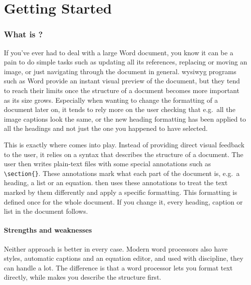 \part{Getting Started}
\section{What is ?}\label{sec:what-is-latex}
If you've ever had to deal with a large Word document, you know it can be a pain to do simple tasks such as updating all its references, replacing or moving an image, or just navigating through the document in general.
\gls{wysiwyg} programs such as Word provide an instant visual preview of the document,
but they tend to reach their limits once the structure of a document becomes more important as its size grows.
Especially when wanting to change the formatting of a document later on,
it tends to rely more on the user checking that e.g.\ all the image captions look the same,
or the new heading formatting has been applied to all the headings and not just the one you happened to have selected.

This is exactly where  comes into play.
Instead of providing direct visual feedback to the user, it relies on a syntax that describes the structure of a document.
The user then writes plain-text files with some special annotations such as \texttt{\textbackslash section\{\}}.
These annotations mark what each part of the document is, e.g.\ a heading, a list or an equation.
 then uses these annotations to treat the text marked by them differently and apply a specific formatting.
This formatting is defined once for the whole document.
If you change it, every heading, caption or list in the document follows.

\subsection{Strengths and weaknesses}\label{sec:strengths-weaknesses}

Neither approach is better in every case.
Modern word processors also have styles, automatic captions and an equation editor,
and used with discipline, they can handle a lot.
The difference is that a word processor lets you format text directly,
while  makes you describe the structure first.

